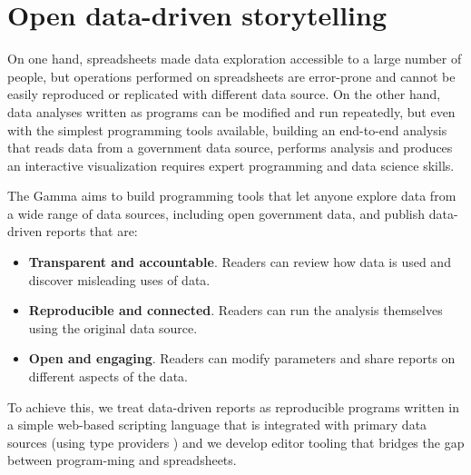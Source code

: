 \documentclass[sigconf,english]{acmart}
\begin{document}

\maketitle
\section{Open data-driven storytelling}
On one hand, spreadsheets made data exploration accessible to a large number of people, but 
operations performed on spreadsheets are error-prone and cannot be easily reproduced or 
replicated with different data source. On the other hand, data analyses written as programs
can be modified and run repeatedly, but even with the simplest programming tools available, 
building an end-to-end analysis that reads data from a government data source, performs analysis 
and produces an interactive visualization requires expert programming and data science skills.

The Gamma aims to build programming tools that let anyone explore data from a wide range of data 
sources, including open government data, and publish data-driven reports that are:

\begin{itemize}
\item	\textbf{Transparent and accountable}. Readers can review how data is used and discover misleading uses of data.
\item	\textbf{Reproducible and connected}. Readers can run the analysis themselves using the original data source.
\item	\textbf{Open and engaging}. Readers can modify parameters and share reports on different aspects of the data.
\end{itemize}

\noindent
To achieve this, we treat data-driven reports as reproducible programs written in a simple web-based 
scripting language that is integrated with primary data sources (using type providers \cite{inforich,fsdata,idris}) 
and we develop editor tooling that bridges the gap between program-ming and spreadsheets.
\end{document}
